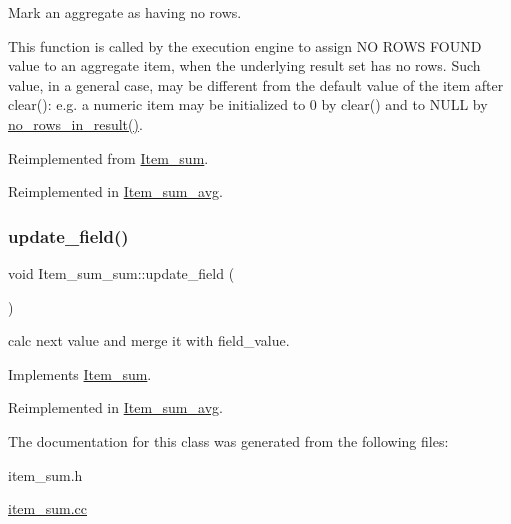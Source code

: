 Mark an aggregate as having no rows.

This function is called by the execution engine to assign \textquotesingle{}NO R\+O\+WS F\+O\+U\+ND\textquotesingle{} value to an aggregate item, when the underlying result set has no rows. Such value, in a general case, may be different from the default value of the item after \textquotesingle{}clear()\textquotesingle{}\+: e.\+g. a numeric item may be initialized to 0 by clear() and to N\+U\+LL by \mbox{\hyperlink{classItem__sum__sum_aa610e5d4e5371dcea4625416d7d79d93}{no\+\_\+rows\+\_\+in\+\_\+result()}}. 

Reimplemented from \mbox{\hyperlink{classItem__sum_aba62f301a61ca3e686abf23e109bb0a8}{Item\+\_\+sum}}.



Reimplemented in \mbox{\hyperlink{classItem__sum__avg_ab4cfa5a3c42abc40f7f3fdb95c92d568}{Item\+\_\+sum\+\_\+avg}}.

\mbox{\label{classItem__sum__sum_a00f3c26e38463e41da4e41613d37f0bf}} 
\subsubsection{\texorpdfstring{update\+\_\+field()}{update\_field()}}
{\footnotesize\ttfamily void Item\+\_\+sum\+\_\+sum\+::update\+\_\+field (\begin{DoxyParamCaption}{ }\end{DoxyParamCaption})\hspace{0.3cm}{\ttfamily [virtual]}}

calc next value and merge it with field\+\_\+value. 

Implements \mbox{\hyperlink{classItem__sum}{Item\+\_\+sum}}.



Reimplemented in \mbox{\hyperlink{classItem__sum__avg_a682bfcb0bec9487bcd2c26d1aa200aa5}{Item\+\_\+sum\+\_\+avg}}.



The documentation for this class was generated from the following files\+:\begin{DoxyCompactItemize}
\item 
item\+\_\+sum.\+h\item 
\mbox{\hyperlink{item__sum_8cc}{item\+\_\+sum.\+cc}}\end{DoxyCompactItemize}
